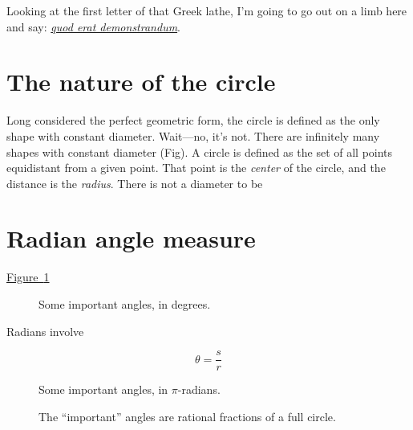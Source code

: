 \documentclass{article}
\begin{document}
\noindent Looking at the first letter of that Greek lathe, I'm going to go out on a limb here and say: \href{http://en.wikipedia.org/wiki/Q.E.D.}{\emph{quod erat demonstrandum}}.


\section{The nature of the circle} %
\label{sec:the_nature_of_the_circle}

Long considered the perfect geometric form, the circle is defined as the only shape with constant diameter. Wait---no, it's not. There are infinitely many shapes with constant diameter (Fig). A circle is defined as the set of all points equidistant from a given point. That point is the \emph{center} of the circle, and the distance is the \emph{radius}. There is not a diameter to be


\section{Radian angle measure} %
\label{sec:radian_angle_measure}


\hyperref[fig:degree-angles]{Figure~}\ref{fig:degree-angles}

\begin{figure}
\begin{center}
\end{center}
\caption{Some important angles, in degrees.\label{fig:degree-angles}}
\end{figure}

Radians involve

\[ \theta = \frac{s}{r} \]

\begin{figure}
\begin{center}
\end{center}
\caption{Some important angles, in $\pi$-radians.\label{fig:pi-angles}}
\end{figure}

\begin{figure}
\begin{center}
\end{center}
\caption{The ``important'' angles are rational fractions of a full circle.\label{fig:angle-fractions}}
\end{figure}
\end{document}
